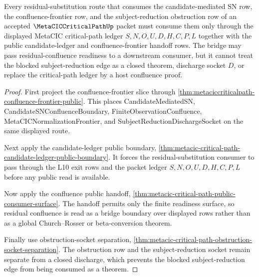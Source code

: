 \begin{theorem}
\label{thm:metacic-critical-path-bridge-boundary}
Every residual-substitution route that consumes the candidate-mediated SN row, the confluence-frontier row, and the subject-reduction obstruction row of an accepted $\MetaCICCriticalPathUp$ packet must consume them only through the displayed MetaCIC critical-path ledger $S,N,O,U,D,H,C,P,L$ together with the public candidate-ledger and confluence-frontier handoff rows. The bridge may pass residual-confluence readiness to a downstream consumer, but it cannot treat the blocked subject-reduction edge as a closed theorem, discharge socket $D$, or replace the critical-path ledger by a host confluence proof.
\end{theorem}
\begin{proof}
First project the confluence-frontier slice through \autoref{thm:metaciccriticalpath-confluence-frontier-public}. This places CandidateMediatedSN, CandidateSNConfluenceBoundary, FiniteObservationConfluence, MetaCICNormalizationFrontier, and SubjectReductionDischargeSocket on the same displayed route.

Next apply the candidate-ledger public boundary, \autoref{thm:metacic-critical-path-candidate-ledger-public-boundary}. It forces the residual-substitution consumer to pass through the L10 exit rows and the packet ledger $S,N,O,U,D,H,C,P,L$ before any public read is available.

Now apply the confluence public handoff, \autoref{thm:metacic-critical-path-public-consumer-surface}. The handoff permits only the finite readiness surface, so residual confluence is read as a bridge boundary over displayed rows rather than as a global Church--Rosser or beta-conversion theorem.

Finally use obstruction-socket separation, \autoref{thm:metacic-critical-path-obstruction-socket-separation}. The obstruction row and the subject-reduction socket remain separate from a closed discharge, which prevents the blocked subject-reduction edge from being consumed as a theorem.
\end{proof}
